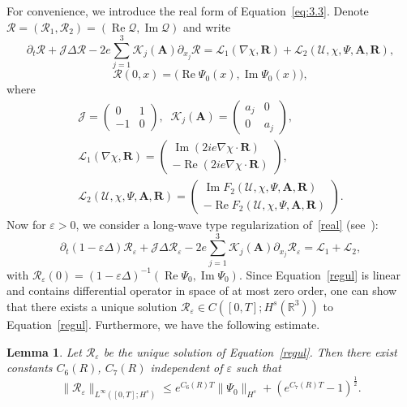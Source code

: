\documentclass[10pt]{amsart}
\newtheorem{lemm}[theo]{Lemma}\newtheorem{prop}[theo]{Proposition}\newtheorem{coro}[theo]{Corollary}\newtheorem{conj}[theo]{Conjecture}
\theoremstyle{definition}\newtheorem{defi}[theo]{Definition}\newtheorem{rema}[theo]{Remark}\newtheorem{exam}[theo]{Example}\newtheorem{exem}[theo]{Example}\newtheorem{nota}[theo]{Notation}
\newcommand{\BA}{\mathbf{A}}
\newcommand{\BR}{\mathbf{R}}
\newcommand{\R}{\mathbb{R}}
\DeclareMathOperator{\IM}{Im}
\DeclareMathOperator{\RE}{Re}
\begin{document}
For convenience, we introduce the real form of Equation~\eqref{eq:3.3}. Denote $\mathcal{R}=(\mathcal{R}_1,\mathcal{R}_2) =(\RE \mathcal{Q}, \IM\mathcal{Q})$ and write
\begin{equation}\label{real}
\partial_t \mathcal{R} + \mathcal{J} \Delta \mathcal{R} - 2e \sum_{j=1}^3 \mathcal{K}_j (\BA) \partial_{x_j} \mathcal{R} =\mathcal{L}_1 (\nabla \chi, \BR) +\mathcal{L}_2 (\mathcal{U}, \chi, \Psi, \BA, \BR),
\end{equation}
\[
\mathcal{R}(0,x)= \big(\RE \Psi_0(x),\IM\Psi_0(x) \big),
\]
where
\begin{gather*}
\mathcal{J} =
\begin{pmatrix}
0&1\\
-1&0
\end{pmatrix},
\;\; \mathcal{K}_j(\BA) =
\begin{pmatrix}
{a}_j&0\\
0&{a}_j
\end{pmatrix},
\\
\mathcal{L}_1 (\nabla\chi, \BR)=
\begin{pmatrix}
\IM(2ie \nabla \chi \cdot \BR) \\
-\RE (2ie \nabla \chi \cdot \BR)
\end{pmatrix},
\\
\mathcal{L}_2 (\mathcal{U}, \chi, \Psi, \BA, \BR) =
\begin{pmatrix}
\IM F_2(\mathcal{U}, \chi, \Psi, \BA, \BR) \\
-\RE F_2(\mathcal{U}, \chi, \Psi, \BA, \BR)
\end{pmatrix}.
\end{gather*}
Now for $\varepsilon>0$, we consider a long-wave type regularization of~\eqref{real} (see~\cite{CG}):
\begin{equation}\label{regul}
\partial_t (1-\varepsilon \Delta) \mathcal{R}_\varepsilon +\mathcal{J} \Delta \mathcal{R}_\varepsilon -2e \sum_{j=1}^3 \mathcal{K}_j(\BA) \partial_{x_j} \mathcal{R}_\varepsilon =\mathcal{L}_1+\mathcal{L}_2,
\end{equation}
with $\mathcal{R}_\varepsilon(0) =(1-\varepsilon \Delta)^{-1}(\RE \Psi_0,\IM\Psi_0)$. Since Equation~\eqref{regul} is linear and contains differential operator in space of at most zero order, one can show that there exists a unique solution $\mathcal{R}_\varepsilon \in C([0,T];H^s(\R^3))$ to Equation~\eqref{regul}. Furthermore, we have the following estimate.

\begin{lemm}\label{regul1}
Let $\mathcal{R}_\varepsilon$ be the unique solution of Equation~\eqref{regul}. Then there exist constants $C_6(R)$, $C_7(R)$ independent of $\varepsilon$ such that
\[
\| \mathcal{R}_\varepsilon \|_{L^\infty([0,T];H^s)}
\leq e^{C_6(R)T} \| \Psi_0 \|_{H^s} +\left(e^{C_7(R)T}-1 \right)^{\frac{1}{2}}.
\]
\end{lemm}
\end{document}
